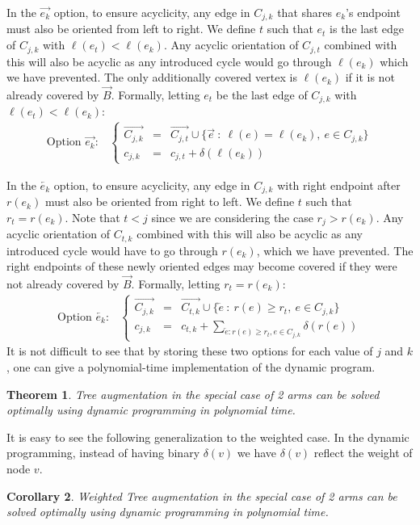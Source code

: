 \documentclass{article}
\newtheorem{theorem}{Theorem}
\newtheorem{cor}[theorem]{Corollary}
\newcommand{\ora}{\overrightarrow}
\newcommand{\ola}{\overleftarrow}
\begin{document}
In the $\ora{e_k}$ option, to ensure acyclicity, any edge in $C_{j,k}$ that
shares $e_k$'s endpoint must also be oriented from left to right.  
We define $t$ such that $e_t$ is the last edge of $C_{j,k}$ with $\ell(e_t) <
    \ell(e_k)$.
Any
acyclic orientation of $C_{j,t}$ combined with this will also be
acyclic as any introduced cycle would go through $\ell(e_k)$
which we have prevented.  The only additionally covered vertex is
$\ell(e_k)$ if it is not already covered by $\ora B$.
Formally, letting $e_t$ be the last edge of $C_{j,k}$ with $\ell(e_t) <
    \ell(e_k)$:
\[
\begin{array}{ll}
 \mbox{Option }\ora{e_k}: &
  \left\{
    \begin{array}{lll} 
      \ora{C_{j,k}} &=&
      \ora{C_{j,t}} \cup \{ \ora{e}\ : \ \ell(e) = \ell(e_k),\ e \in C_{j,k} \} \\
      c_{j,k} &=& c_{j,t} + \delta(\ell(e_k))
    \end{array}
  \right.
\end{array}
\]

In the $\ola{e_k}$ option, to ensure acyclicity, any edge in $C_{j,k}$
with right endpoint after $r(e_k)$ must also be oriented from right to
left. We define $t$ such that $r_t = r(e_k)$. Note that $t<j$ since
we are considering the case $r_j>r(e_k)$.
Any acyclic orientation of $C_{t,k}$ combined with this will
also be acyclic as any introduced cycle would have to go through
$r(e_k)$, which we have prevented.  The right endpoints of these newly
oriented edges may become covered if they were not already covered by
$\ora B$.  Formally, letting $r_t = r(e_k)$:
\[
\begin{array}{ll}
  \mbox{Option }\ola{e_k}: &
  \left\{
    \begin{array}{lll} 
      \ora{C_{j,k}} &=&
      \ora{C_{t,k}} \cup \{ \ola{e}\ : \ r(e) \ge r_t,\ e \in
      C_{j,k} \} \\
      c_{j,k} &=& c_{t,k}+\sum_{\ola{e}:r(e) \ge r_t, e \in
      C_{j,k}} \delta(r(e))
    \end{array}
  \right.
\end{array}
\]
It is not difficult to see that by storing these two options for
each value of $j$ and $k$, one can give a polynomial-time implementation
of the dynamic program.


\begin{theorem}
{\sc Tree augmentation} in the special case of 2 arms can be solved
optimally using dynamic programming in polynomial time.
\end{theorem}
It is easy to see the following generalization to the weighted case.
In the dynamic programming, instead of having binary $\delta(v)$ we have
$\delta(v)$ reflect the weight of node $v$.  
\begin{cor}
{\sc Weighted Tree augmentation} in the special case of 2 arms can be
solved optimally using dynamic programming in polynomial time.
\end{cor}
\end{document}
